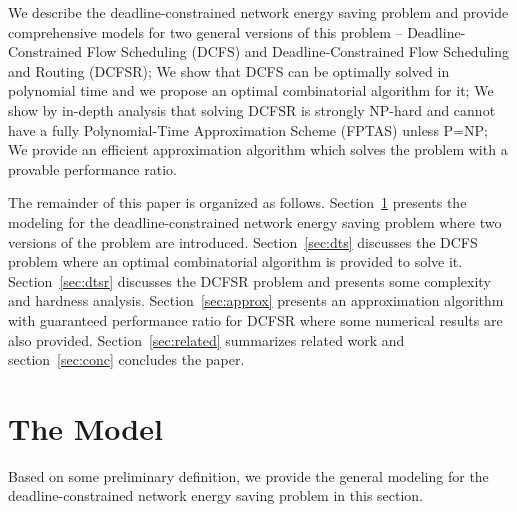 \documentclass[10pt, conference, compsocconf]{IEEEtran}
\begin{document}
\iffalse
\begin{itemize}
\item We describe the deadline-constrained network energy saving problem in a comprehensive way and provide models for two general versions of this problem -- Deadline-Constrained Flow Scheduling (DCFS) and Deadline-Constrained Flow Scheduling and Routing (DCFSR);
\item We show that DCFS can be optimally solved in polynomial time and we propose an optimal combinatorial algorithm for it;
\item We show by in-depth analysis that solving DCFSR is strongly NP-hard and cannot have a Polynomial-Time Approximation Scheme (PTAS); and
\item We provide an efficient approximation algorithm which solves the problem with a provable performance ratio.
\end{itemize}
\fi
 We describe the deadline-constrained network energy saving problem and provide comprehensive models for two general versions of this problem -- Deadline-Constrained Flow Scheduling (DCFS) and Deadline-Constrained Flow Scheduling and Routing (DCFSR);  We show that DCFS can be optimally solved in polynomial time and we propose an optimal combinatorial algorithm for it;  We show by in-depth analysis that solving DCFSR is strongly NP-hard and cannot have a fully Polynomial-Time Approximation Scheme (FPTAS) unless P=NP;  We provide an efficient approximation algorithm which solves the problem with a provable performance ratio.

The remainder of this paper is organized as follows. Section~\ref{sec:model} presents the modeling for the deadline-constrained network energy saving problem where two versions of the problem are introduced. Section~\ref{sec:dts} discusses the DCFS problem where an optimal combinatorial algorithm is provided to solve it. Section~\ref{sec:dtsr} discusses the DCFSR problem and presents some complexity and hardness analysis. Section~\ref{sec:approx} presents an approximation algorithm with guaranteed performance ratio for DCFSR where some numerical results are also provided. Section~\ref{sec:related} summarizes related work and section~\ref{sec:conc} concludes the paper.


\section{The Model}
\label{sec:model}

Based on some preliminary definition, we provide the general modeling for the deadline-constrained network energy saving problem in this section. 
\end{document}
